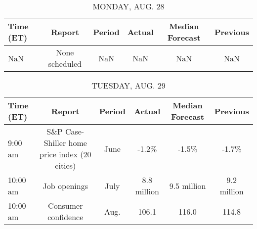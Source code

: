 \documentclass{article}%
\begin{document}
%
\normalsize%


\begin{table}[htbp]%
\caption{MONDAY, AUG. 28}%
\centering%
\begin{adjustbox}{width=1\textwidth}%
\begin{tabular}{lccccc}
\toprule
Time (ET) &         Report & Period & Actual & Median Forecast & Previous \\
\midrule
      NaN & None scheduled &    NaN &    NaN &             NaN &      NaN \\
\bottomrule
\end{tabular}
%
\end{adjustbox}%
\end{table}

%


\begin{table}[htbp]%
\caption{TUESDAY, AUG. 29}%
\centering%
\begin{adjustbox}{width=1\textwidth}%
\begin{tabular}{lccccc}
\toprule
Time (ET) &                                        Report & Period &      Actual & Median Forecast &    Previous \\
\midrule
  9:00 am & S\&P Case-Shiller home price index (20 cities) &   June &       -1.2\% &           -1.5\% &       -1.7\% \\
 10:00 am &                                  Job openings &   July & 8.8 million &     9.5 million & 9.2 million \\
 10:00 am &                           Consumer confidence &   Aug. &       106.1 &           116.0 &       114.8 \\
\bottomrule
\end{tabular}
%
\end{adjustbox}%
\end{table}

%
\end{document}
